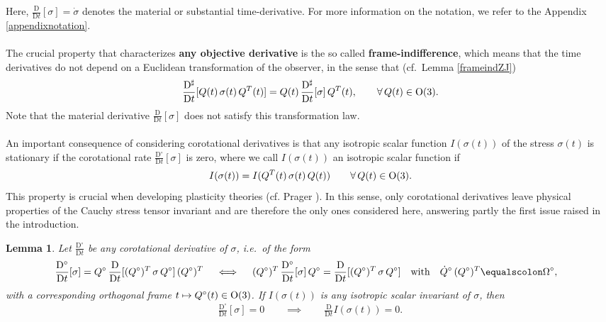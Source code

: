 \documentclass[10pt]{article}
\newcounter{theoremCounter}
\numberwithin{theoremCounter}{section}
\theoremstyle{plain}
\newtheorem{lem}[theoremCounter]{Lemma}
\theoremstyle{definition}
\newcommand{\OO}{{\rm O}}
\newcommand{\DD}{\mathrm{D}}
\numberwithin{equation}{section}
\begin{document}
Here, $\frac{\DD}{\DD t}[\sigma] = \dot \sigma$ denotes the material or substantial time-derivative. For more information on the notation, we refer to the Appendix \ref{appendixnotation}. \\
\\
The crucial property that characterizes \textbf{any objective derivative}\cite{kolev2024objective} is the so called \textbf{frame-indifference}, which means that the time derivatives do not depend on a Euclidean transformation of the observer, in the sense that (cf.~Lemma \ref{frameindZJ})
	\begin{align}
	\label{eq0013.122}
	\frac{\DD^{\sharp}}{\DD t}[Q(t) \, \sigma(t) \, Q^T(t)] = Q(t) \, \frac{\DD^{\sharp}}{\DD t} [\sigma] \, Q^T(t), \qquad \forall \, Q(t) \in \OO(3).
	\end{align}
Note that the material derivative $\frac{\DD}{\DD t}[\sigma]$ does not satisfy this transformation law. \\
\\
An important consequence of considering corotational derivatives is that any isotropic scalar function $I(\sigma(t))$ of the stress $\sigma(t)$ is stationary if the corotational rate $\frac{\DD^{\circ}}{\DD t}[\sigma]$ is zero, where we call $I(\sigma(t))$ an isotropic scalar function if
	\begin{align}
	I(\sigma(t)) = I(Q^T(t) \, \sigma(t) \, Q(t)) \qquad \forall \, Q(t) \in \OO(3).
	\end{align}
This property is crucial when developing plasticity theories (cf. Prager \cite{prager1961}). In this sense, only corotational derivatives leave physical properties of the Cauchy stress tensor invariant and are therefore the only ones considered here, answering partly the first issue raised in the introduction.
%
\begin{lem}
Let $\frac{\DD^{\circ}}{\DD t}$ be any corotational derivative of $\sigma$, i.e.\ of the form
	\begin{align}
	\label{eqlemma3.1a}
	\hspace*{-8pt} \frac{\DD^{\circ}}{\DD t}[\sigma] = Q^{\circ} \, \frac{\DD}{\DD t}[(Q^{\circ})^T \, \sigma \, Q^{\circ}] \, (Q^{\circ})^T \quad \iff \quad (Q^{\circ})^T \, \frac{\DD^{\circ}}{\DD t}[\sigma] \, Q^{\circ} = \frac{\DD}{\DD t}[(Q^{\circ})^T \, \sigma \, Q^{\circ}] \quad \textnormal{with} \quad \dot{Q}^{\circ} \, (Q^{\circ})^T \equalscolon \Omega^{\circ}  ,
	\end{align}
with a corresponding orthogonal frame $t\mapsto Q^{\circ}(t) \in \OO(3)$. If $I(\sigma(t))$ is any isotropic scalar invariant of $\sigma$, then
	\begin{align}
	\label{eqlemma3.1}
	\frac{\DD^{\circ}}{\DD t}[\sigma] = 0 \qquad \implies \qquad \frac{\DD}{\DD t}I(\sigma(t)) = 0.
	\end{align}
\end{lem}
\end{document}
